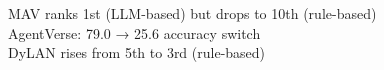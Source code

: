 \documentclass[preview]{standalone}
\begin{document}
MAV ranks 1st (LLM-based) but drops to 10th (rule-based)\\AgentVerse: 79.0 → 25.6 accuracy switch\\DyLAN rises from 5th to 3rd (rule-based)\\
\end{document}
